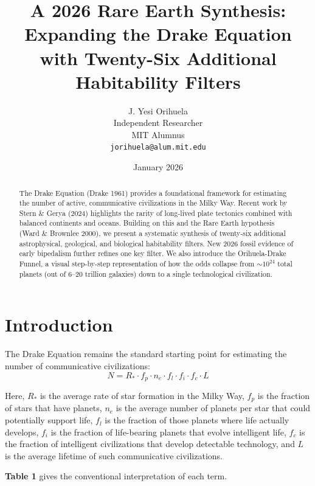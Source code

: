 \documentclass[12pt]{article}
\title{A 2026 Rare Earth Synthesis: Expanding the Drake Equation with Twenty-Six Additional Habitability Filters}
\author{J. Yesi Orihuela \\
Independent Researcher \\
MIT Alumnus \\
\texttt{jorihuela@alum.mit.edu}}
\date{January 2026}
\begin{document}
\maketitle

\begin{abstract}
The Drake Equation (Drake 1961) provides a foundational framework for estimating the number of active, communicative civilizations in the Milky Way. Recent work by Stern \& Gerya (2024) highlights the rarity of long-lived plate tectonics combined with balanced continents and oceans. Building on this and the Rare Earth hypothesis (Ward \& Brownlee 2000), we present a systematic synthesis of twenty-six additional astrophysical, geological, and biological habitability filters. New 2026 fossil evidence of early bipedalism further refines one key filter. We also introduce the Orihuela-Drake Funnel, a visual step-by-step representation of how the odds collapse from $\sim10^{24}$ total planets (out of 6--20 trillion galaxies) down to a single technological civilization.
\end{abstract}

\section{Introduction}
The Drake Equation remains the standard starting point for estimating the number of communicative civilizations:
\begin{equation}
N = R_* \cdot f_p \cdot n_e \cdot f_l \cdot f_i \cdot f_c \cdot L
\end{equation}

Here, $R_*$ is the average rate of star formation in the Milky Way, $f_p$ is the fraction of stars that have planets, $n_e$ is the average number of planets per star that could potentially support life, $f_l$ is the fraction of those planets where life actually develops, $f_i$ is the fraction of life-bearing planets that evolve intelligent life, $f_c$ is the fraction of intelligent civilizations that develop detectable technology, and $L$ is the average lifetime of such communicative civilizations.

\textbf{Table 1} gives the conventional interpretation of each term.
\end{document}
